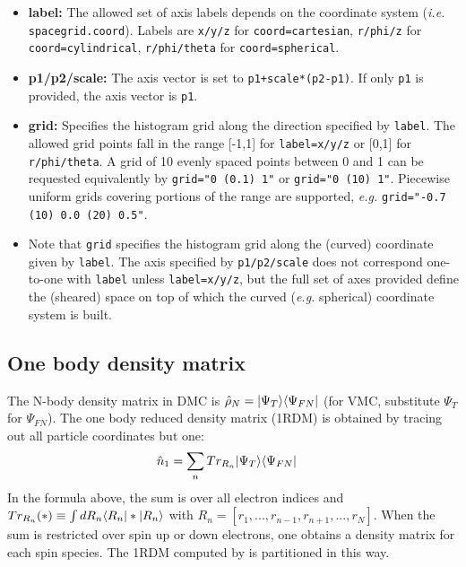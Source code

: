 \begin{itemize}
  \item{\textbf{label:} The allowed set of axis labels depends on the coordinate system (\textit{i.e.} \texttt{spacegrid.coord}).  Labels are \texttt{x/y/z} for \texttt{coord=cartesian}, \texttt{r/phi/z} for \texttt{coord=cylindrical}, \texttt{r/phi/theta} for \texttt{coord=spherical}.}
  \item{\textbf{p1/p2/scale:} The axis vector is set to \texttt{p1+scale*(p2-p1)}.  If only \texttt{p1} is provided, the axis vector is \texttt{p1}.}
  \item{\textbf{grid:} Specifies the histogram grid along the direction specified by \texttt{label}.  The allowed grid points fall in the range [-1,1] for \texttt{label=x/y/z} or [0,1] for \texttt{r/phi/theta}.  A grid of 10 evenly spaced points between 0 and 1 can be requested equivalently by \texttt{grid="0 (0.1) 1"} or  \texttt{grid="0 (10) 1"}.  Piecewise uniform grids covering portions of the range are supported, \textit{e.g.} \texttt{grid="-0.7 (10) 0.0 (20) 0.5"}.  }
  \item{Note that \texttt{grid} specifies the histogram grid along the (curved) coordinate given by \texttt{label}.  The axis specified by \texttt{p1/p2/scale} does not correspond one-to-one with \texttt{label} unless \texttt{label=x/y/z}, but the full set of axes provided define the (sheared) space on top of which the curved (\textit{e.g.} spherical) coordinate system is built. }
\end{itemize}






\subsection{One body density matrix}
The N-body density matrix in DMC is $\hat{\rho}_N=\lvert \Psi_{T} \rangle  \langle \Psi_{FN} \rvert$ (for VMC, substitute $\Psi_T$ for $\Psi_{FN}$).  The one body reduced density matrix (1RDM) is obtained by tracing out all particle coordinates but one:
\begin{align}
  \hat{n}_1 &= \sum_nTr_{R_n}\lvert \Psi_{T} \rangle  \langle \Psi_{FN} \rvert
\end{align}
In the formula above, the sum is over all electron indices and $Tr_{R_n}(*)\equiv\int dR_n\langle R_n \rvert*\lvert R_n \rangle$ with $R_n=[r_1,...,r_{n-1},r_{n+1},...,r_N]$.  When the sum is restricted over spin up or down electrons, one obtains a density matrix for each spin species.  The 1RDM computed by \qmcpack is partitioned in this way.

